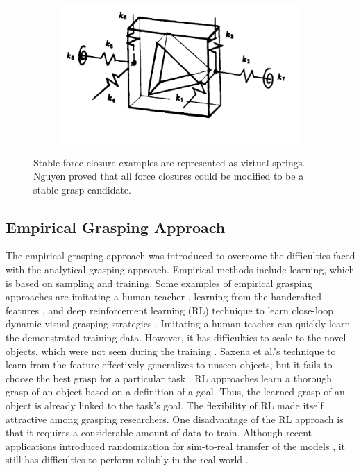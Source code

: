 \begin{figure}
\begin{subfigure}{0.31\textwidth}
      \caption{} \label{fig:1b}
    \end{subfigure}%
    \hspace*{\fill}   %
    \begin{subfigure}{0.31\textwidth}
      \includegraphics[width=\linewidth]{figures/graspC.png}
      \caption{} \label{fig:1c}
    \end{subfigure}

\caption{Stable force closure examples are represented as virtual springs. Nguyen proved that all force closures could be modified to be a stable grasp candidate\cite{Nguyen1987}.} \label{fig:1}
\end{figure}

\subsection{Empirical Grasping Approach}


The empirical grasping approach was introduced to overcome the difficulties faced with the analytical grasping approach. Empirical methods include learning, which is based on sampling and training. Some examples of empirical grasping approaches are imitating a human teacher \cite{Ekvall2004}, learning from the handcrafted features \cite{Saxena2008},  and deep reinforcement learning (RL) technique to learn close-loop dynamic visual grasping strategies \cite{Kalashnikov2018}. Imitating a human teacher can quickly learn the demonstrated training data. However, it has difficulties to scale to the novel objects, which were not seen during the training \cite{Sahbani2012}. Saxena et al.'s technique to learn from the feature effectively generalizes to unseen objects, but it fails to choose the best grasp for a particular task \cite{Sahbani2012}. RL approaches learn a thorough grasp of an object based on a definition of a goal. Thus, the learned grasp of an object is already linked to the task's goal. The flexibility of RL made itself attractive among grasping researchers. One disadvantage of the RL approach is that it requires a considerable amount of data to train. Although recent applications introduced randomization for sim-to-real transfer of the models \cite{Andrychowicz2020}, it still has difficulties to perform reliably in the real-world \cite{Caldera2018}.

